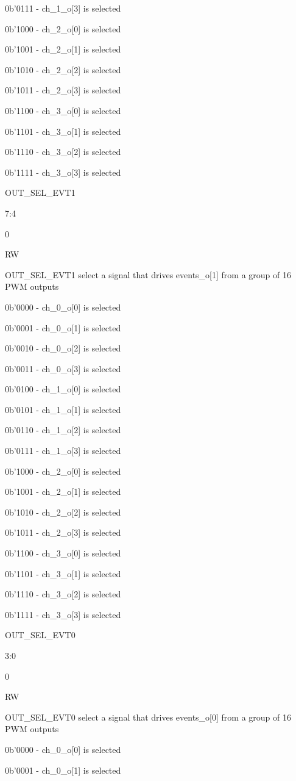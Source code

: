 0b’0111 - ch_1_o[3] is selected

0b’1000 - ch_2_o[0] is selected

0b’1001 - ch_2_o[1] is selected

0b’1010 - ch_2_o[2] is selected

0b’1011 - ch_2_o[3] is selected

0b’1100 - ch_3_o[0] is selected

0b’1101 - ch_3_o[1] is selected

0b’1110 - ch_3_o[2] is selected

0b’1111 - ch_3_o[3] is selected

OUT_SEL_EVT1
	

7:4
	

0
	

RW
	

OUT_SEL_EVT1 select a signal that drives events_o[1] from a group of 16 PWM outputs

0b’0000 - ch_0_o[0] is selected

0b’0001 - ch_0_o[1] is selected

0b’0010 - ch_0_o[2] is selected

0b’0011 - ch_0_o[3] is selected

0b’0100 - ch_1_o[0] is selected

0b’0101 - ch_1_o[1] is selected

0b’0110 - ch_1_o[2] is selected

0b’0111 - ch_1_o[3] is selected

0b’1000 - ch_2_o[0] is selected

0b’1001 - ch_2_o[1] is selected

0b’1010 - ch_2_o[2] is selected

0b’1011 - ch_2_o[3] is selected

0b’1100 - ch_3_o[0] is selected

0b’1101 - ch_3_o[1] is selected

0b’1110 - ch_3_o[2] is selected

0b’1111 - ch_3_o[3] is selected

OUT_SEL_EVT0
	

3:0
	

0
	

RW
	

OUT_SEL_EVT0 select a signal that drives events_o[0] from a group of 16 PWM outputs

0b’0000 - ch_0_o[0] is selected

0b’0001 - ch_0_o[1] is selected

